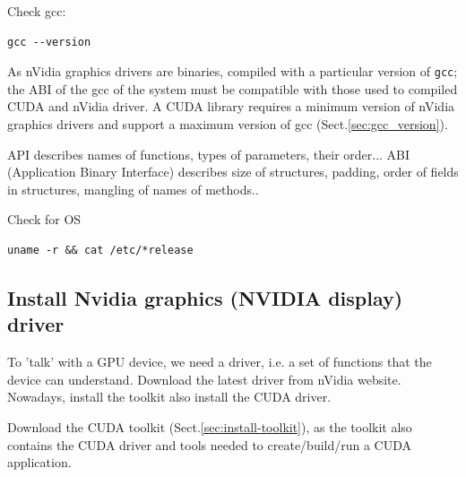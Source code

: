 Check gcc:
\begin{verbatim}
gcc --version
\end{verbatim}

As nVidia graphics drivers are binaries, compiled with a particular version of
\verb!gcc!; the ABI of the gcc of the system must be compatible with those used
to compiled CUDA and nVidia driver.  A CUDA library requires a minimum version of
nVidia graphics drivers and support a maximum version of gcc
(Sect.\ref{sec:gcc_version}).

\begin{framed}
  API describes names of functions, types of parameters, their
  order... ABI (Application Binary Interface) describes size of
  structures, padding, order of fields in structures, mangling of names
  of methods..
\end{framed}

Check for OS
\begin{verbatim}
uname -r && cat /etc/*release
\end{verbatim}


\subsection{Install Nvidia graphics (NVIDIA display) driver}
\label{sec:nvidia-graphics_driver}

To 'talk' with a GPU device, we need a driver, i.e. a set of functions that the
device can understand.  Download the latest driver from nVidia website. Nowadays, install the toolkit
also install the CUDA driver. 

Download the CUDA toolkit (Sect.\ref{sec:install-toolkit}), as the toolkit also
contains the CUDA driver and tools needed to create/build/run a CUDA application.

